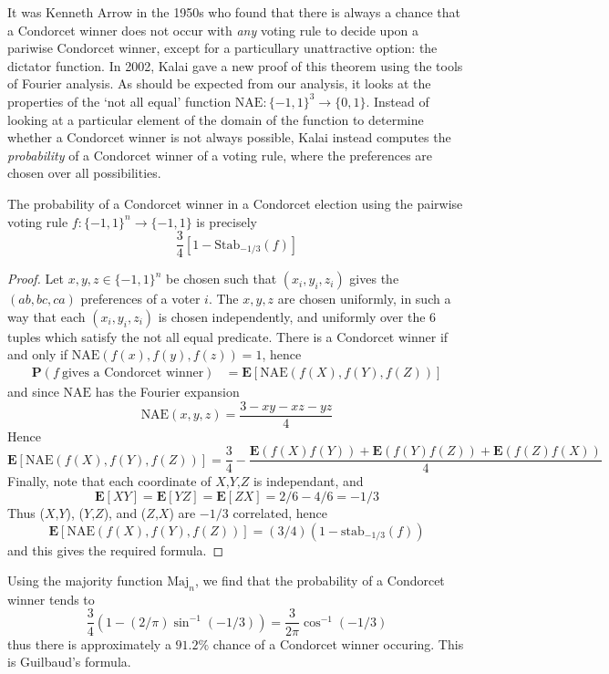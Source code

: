It was Kenneth Arrow in the 1950s who found that there is always a chance that a Condorcet winner does not occur with {\it any} voting rule to decide upon a pariwise Condorcet winner, except for a particullary unattractive option: the dictator function. In 2002, Kalai gave a new proof of this theorem using the tools of Fourier analysis. As should be expected from our analysis, it looks at the properties of the `not all equal' function $\text{NAE}: \{ -1, 1 \}^3 \to \{ 0, 1 \}$. Instead of looking at a particular element of the domain of the function to determine whether a Condorcet winner is not always possible, Kalai instead computes the {\it probability} of a Condorcet winner of a voting rule, where the preferences are chosen over all possibilities. 

\begin{lemma}
    The probability of a Condorcet winner in a Condorcet election using the pairwise voting rule $f: \{ -1, 1 \}^n \to \{ -1, 1 \}$ is precisely
    \[ \frac{3}{4} [1 - \text{Stab}_{-1/3}(f)] \]
\end{lemma}
\begin{proof}
    Let $x,y,z \in \{ -1, 1 \}^n$ be chosen such that $(x_i,y_i,z_i)$ gives the $(ab,bc,ca)$ preferences of a voter $i$. The $x,y,z$ are chosen uniformly, in such a way that each $(x_i,y_i,z_i)$ is chosen independently, and uniformly over the 6 tuples which satisfy the not all equal predicate. There is a Condorcet winner if and only if $\text{NAE}(f(x),f(y),f(z)) = 1$, hence
    \begin{align*}
        \mathbf{P}(f\ \text{gives a Condorcet winner}) &= \mathbf{E}[\text{NAE}(f(X),f(Y),f(Z))]
    \end{align*}
    and since $\text{NAE}$ has the Fourier expansion
    \[ \text{NAE}(x,y,z) = \frac{3 - xy - xz - yz}{4} \]
    Hence
    \[ \mathbf{E}[\text{NAE}(f(X),f(Y),f(Z))] = \frac{3}{4} - \frac{\mathbf{E}(f(X)f(Y)) + \mathbf{E}(f(Y)f(Z)) + \mathbf{E}(f(Z)f(X))}{4} \]
    Finally, note that each coordinate of $X$,$Y$,$Z$ is independant, and
    \[ \mathbf{E}[XY] = \mathbf{E}[YZ] = \mathbf{E}[ZX] = 2/6 - 4/6 = -1/3 \]
    Thus ($X$,$Y$), ($Y$,$Z$), and ($Z$,$X$) are $-1/3$ correlated, hence
    \[ \mathbf{E}[\text{NAE}(f(X),f(Y),f(Z))] = (3/4)(1 - \text{stab}_{-1/3}(f)) \]
    and this gives the required formula.
\end{proof}

\begin{example}
    Using the majority function $\text{Maj}_n$, we find that the probability of a Condorcet winner tends to
    \[ \frac{3}{4}(1 - (2/\pi) \sin^{-1}(-1/3)) = \frac{3}{2\pi} \cos^{-1}(-1/3) \]
    thus there is approximately a $91.2\%$ chance of a Condorcet winner occuring. This is Guilbaud's formula.
\end{example}


